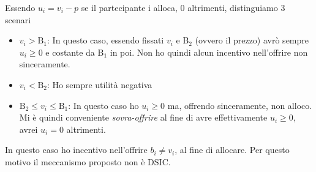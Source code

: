 \documentclass{article}
\begin{document}
            Essendo $ u_i = v_i - p $ se il partecipante i alloca, 0 altrimenti, distinguiamo 3 scenari
            \begin{itemize}
                \item $ v_i > \text{B}_1 $: In questo caso, essendo fissati $ v_i $ e B$_2$ (ovvero il prezzo) avrò sempre $ u_i \geq 0 $ e costante da B$_1$ in poi. Non ho quindi alcun incentivo nell'offrire non sinceramente.
                \item $ v_i < \text{B}_2 $: Ho sempre utilità negativa
                \item $ \text{B}_2 \leq v_i \leq \text{B}_1 $: In questo caso ho $ u_i \geq 0 $ ma, offrendo sinceramente, non alloco. Mi è quindi conveniente \textit{sovra-offrire} al fine di avre effettivamente $ u_i \geq 0 $, avrei $ u_i = 0 $ altrimenti.
            \end{itemize}
            In questo caso ho incentivo nell'offrire $ b_i \neq v_i $, al fine di allocare. Per questo motivo il meccanismo proposto non è DSIC.
        \newpage
\end{document}
